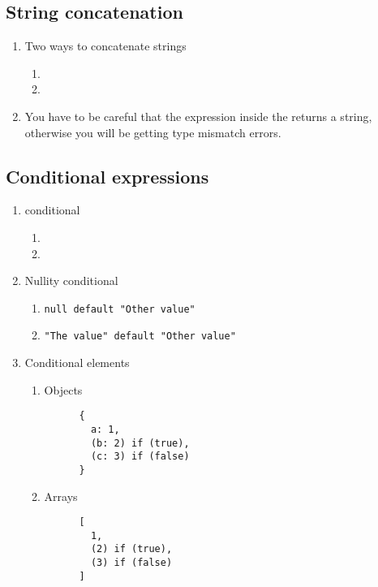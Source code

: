\subsection{String concatenation}
\begin{enumerate}[resume*]
\item Two ways to concatenate strings
  \begin{enumerate}
  \item {}
  \item {}
  \end{enumerate}
\item You have to be careful that the expression inside the \ttt{\$\{\}} returns
  a string, otherwise you will be getting type mismatch errors.
\end{enumerate}

\subsection{Conditional expressions}
\begin{enumerate}[resume*]
\item {} conditional
  \begin{enumerate}
  \item {}
  \item {}
  \end{enumerate}
\item Nullity conditional
  \begin{enumerate}
  \item \lstinline{null default "Other value"}
  \item \lstinline{"The value" default "Other value"}
  \end{enumerate}
\item Conditional elements
  \begin{enumerate}
  \item Objects
    \begin{lstlisting}
      {
        a: 1,
        (b: 2) if (true),
        (c: 3) if (false)
      }
    \end{lstlisting}
  \item Arrays
    \begin{lstlisting}
      [
        1, 
        (2) if (true),
        (3) if (false)
      ]
    \end{lstlisting}
  \end{enumerate}
\end{enumerate}
